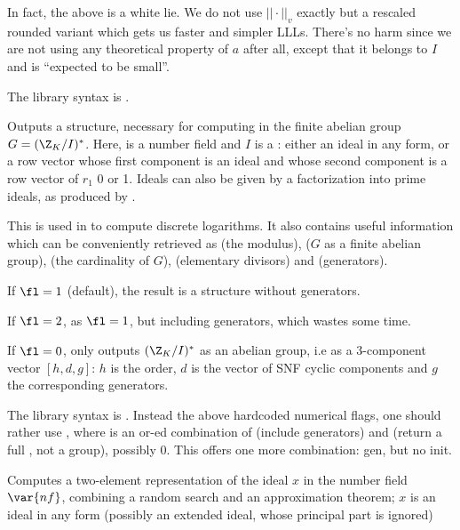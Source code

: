  In fact, the above is a white lie.
We do not use $||\cdot||_v$ exactly but a rescaled rounded variant which
gets us faster and simpler LLLs. There's no harm since we are not using any
theoretical property of $a$ after all, except that it belongs to $I$ and is
``expected to be small''.

The library syntax is .

\label{se:idealstar}
Outputs a  structure,
necessary for computing in the finite abelian group $G = (\Z_K/I)^*$. Here,
 is a number field and $I$ is a : either an ideal in any
form, or a row vector whose first component is an ideal and whose second
component is a row vector of $r_1$ 0 or 1. Ideals can also be given
by a factorization into prime ideals, as produced by .

This  is used in  to compute discrete logarithms. It
also contains useful information which can be conveniently retrieved as
 (the modulus),
 ($G$ as a finite abelian group),
 (the cardinality of $G$),
 (elementary divisors) and
 (generators).

If $\fl=1$ (default), the result is a  structure without
generators.

If $\fl=2$, as $\fl=1$, but including generators, which wastes some time.

If $\fl=0$, only outputs $(\Z_K/I)^*$ as an abelian group,
i.e as a 3-component vector $[h,d,g]$: $h$ is the order, $d$ is the vector of
SNF cyclic components and $g$ the corresponding
generators.

The library syntax is .
Instead the above hardcoded numerical flags, one should rather use
, where  is
an or-ed combination of  (include generators) and 
(return a full , not a group), possibly $0$. This offers
one more combination: gen, but no init.

\label{se:idealtwoelt}
Computes a two-element
representation of the ideal $x$ in the number field $\var{nf}$, combining a
random search and an approximation theorem; $x$ is an ideal
in any form (possibly an extended ideal, whose principal part is ignored)


